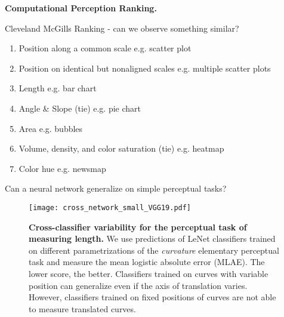 \textbf{Computational Perception Ranking.}

Cleveland McGills Ranking - can we observe something similar?

\begin{enumerate}
	\item Position along a common scale e.g. scatter plot
	\item Position on identical but nonaligned scales e.g. multiple scatter plots
	\item Length e.g. bar chart
	\item Angle \& Slope (tie) e.g. pie chart
	\item Area e.g. bubbles
	\item Volume, density, and color saturation (tie) e.g. heatmap
	\item Color hue e.g. newsmap
\end{enumerate}


Can a neural network generalize on simple perceptual tasks?

\begin{figure}[t]
	  \texttt{[image: cross\_network\_small\_VGG19.pdf]}
  \caption{\textbf{Cross-classifier variability for the perceptual task of measuring length.} We use predictions of LeNet classifiers trained on different parametrizations of the \emph{curvature} elementary perceptual task and measure the mean logistic absolute error (MLAE). The lower score, the better. Classifiers trained on curves with variable position can generalize even if the axis of translation varies. However, classifiers trained on fixed positions of curves are not able to measure translated curves.}
	\label{fig:cross_network}
\end{figure}
